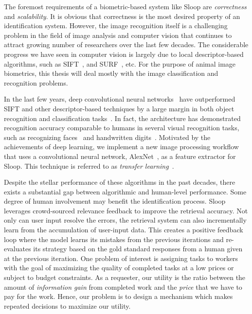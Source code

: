 The foremost requirements of a biometric-based system like Sloop are
\emph{correctness} and \emph{scalability}. It is obvious that correctness is
the most desired property of an identification system. However, the image
recognition itself is a challenging problem in the field of image analysis and
computer vision that continues to attract growing number of researchers over
the last few decades. The considerable progress we have seen in computer vision
is largely due to local descriptor-based algorithms, such as
SIFT~\cite{lowe04}, and SURF~\cite{surf08}, etc.  For the purpose of animal
image biometrics, this thesis will deal mostly with the image classification
and recognition problems.

In the last few years, deep convolutional neural networks~\cite{lecun95,
kriz12} have outperformed SIFT and other descriptor-based techniques by a large
margin in both object recognition and classification tasks~\cite{kriz12,
fisher14, ILSVRC15}. In fact, the architecture has demonstrated recognition
accuracy comparable to humans in several visual recognition tasks, such as
recognizing faces~\cite{deepface14} and handwritten digits~\cite{mnist13}.
Motivated by the achievements of deep learning, we implement a new image
processing workflow that uses a convolutional neural network,
AlexNet~\cite{kriz12}, as a feature extractor for Sloop. This technique is
referred to as \emph{transfer learning}~\cite{transfer, finetune}. 

Despite the stellar performance of these algorithms in the past decades, there
exists a substantial gap between algorithmic and human-level performance. Some
degree of human involvement may benefit the identification process. Sloop
leverages crowd-sourced relevance feedback to improve the retrieval accuracy.
Not only can user input resolve the errors, the retrieval system can also
incrementally learn from the accumulation of user-input data. This creates a
positive feedback loop where the model learns its mistakes from the previous
iterations and re-evaluates its strategy based on the gold standard responses
from a human given at the previous iteration.  One problem of interest is
assigning tasks to workers with the goal of maximizing the quality of completed
tasks at a low prices or subject to budget constraints. As a requester, our
utility is the ratio between the amount of \emph{information gain} from
completed work and the \emph{price} that we have to pay for the work. Hence,
our problem is to design a mechanism which makes repeated decisions to maximize
our utility.

